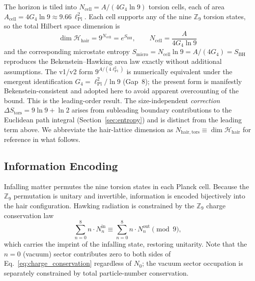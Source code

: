 \documentclass[11pt,a4paper]{article}
\begin{document}
The horizon is tiled into $N_{\mathrm{cell}} = A/(4G_4\ln 9)$ torsion cells,
each of area $A_{\mathrm{cell}} = 4G_4\ln 9 \approx 9.66\,\ell_{\mathrm{Pl}}^2$.
Each cell supports any of the nine $\mathbb{Z}_9$ torsion states, so the
total Hilbert space dimension is
\begin{equation}
  \boxed{\dim\mathcal{H}_{\mathrm{hair}}
    = 9^{N_{\mathrm{cell}}}
    = e^{S_{\mathrm{BH}}},
    \qquad
    N_{\mathrm{cell}} = \frac{A}{4G_4\ln 9}}
  \label{eq:N_hair}
\end{equation}
and the corresponding microstate entropy
$S_{\mathrm{micro}} = N_{\mathrm{cell}}\ln 9 = A/(4G_4) = S_{\mathrm{BH}}$
reproduces the Bekenstein--Hawking area law exactly without additional
assumptions.  The v1/v2 form $9^{A/(4\ell_{\mathrm{Pl}}^2)}$ is numerically
equivalent under the emergent identification $G_4 = \ell_{\mathrm{Pl}}^2/\ln 9$
(Gap~8); the present form is manifestly Bekenstein-consistent and adopted here
to avoid apparent overcounting of the bound.
This is the leading-order result.  The size-independent \emph{correction}
$\Delta S_{\mathrm{tors}} = 9\ln 9 + \ln 2$ arises from subleading boundary
contributions to the Euclidean path integral (Section~\ref{sec:entropy}) and is
distinct from the leading term above.  We abbreviate the hair-lattice dimension
as $N_{\mathrm{hair,tors}} \equiv \dim\mathcal{H}_{\mathrm{hair}}$ for reference
in what follows.

\subsection{Information Encoding}

Infalling matter permutes the nine torsion states in each Planck cell.  Because
the $\mathbb{Z}_9$ permutation is unitary and invertible, information is encoded
bijectively into the hair configuration.  Hawking radiation is constrained
by the $\mathbb{Z}_9$ charge conservation law
\begin{equation}
  \sum_{n=0}^{8} n \cdot N_n^{\mathrm{in}} \equiv \sum_{n=0}^{8} n \cdot N_n^{\mathrm{out}} \pmod{9},
  \label{eq:charge_conservation}
\end{equation}
which carries the imprint of the infalling state, restoring unitarity.
Note that the $n=0$ (vacuum) sector contributes zero to both sides of
Eq.~\eqref{eq:charge_conservation} regardless of $N_0$; the vacuum sector
occupation is separately constrained by total particle-number conservation.

\end{document}

